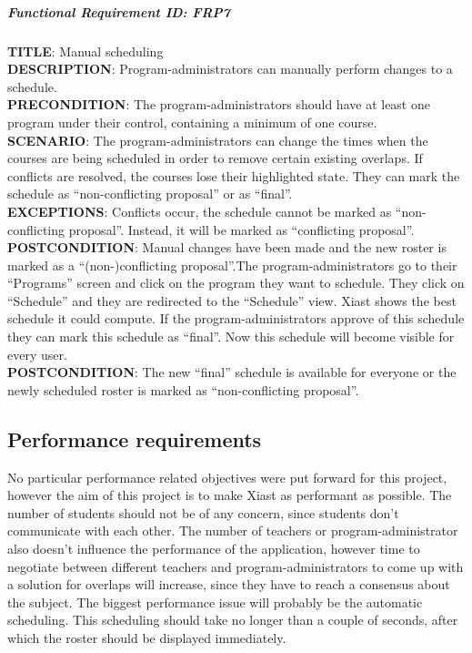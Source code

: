 \documentclass[12pt]{article}
\begin{document}
\subparagraph{Functional Requirement \textbf{ID}:
FRP7}\label{functional-requirement-id-frp7}

\textbf{TITLE}: Manual scheduling\\\textbf{DESCRIPTION}:
Program-administrators can manually perform changes to a
schedule.\\\textbf{PRECONDITION}: The program-administrators should have
at least one program under their control, containing a minimum of one
course.\\\textbf{SCENARIO}: The program-administrators can change the
times when the courses are being scheduled in order to remove certain
existing overlaps. If conflicts are resolved, the courses lose their
highlighted state. They can mark the schedule as ``non-conflicting
proposal'' or as ``final''.\\\textbf{EXCEPTIONS}: Conflicts occur, the
schedule cannot be marked as ``non-conflicting proposal''. Instead, it
will be marked as ``conflicting proposal''.\\\textbf{POSTCONDITION}:
Manual changes have been made and the new roster is marked as a
``(non-)conflicting proposal''.The program-administrators go to their
``Programs'' screen and click on the program they want to schedule. They
click on ``Schedule'' and they are redirected to the ``Schedule'' view.
Xiast shows the best schedule it could compute. If the
program-administrators approve of this schedule they can mark this
schedule as ``final''. Now this schedule will become visible for every
user.\\\textbf{POSTCONDITION}: The new ``final'' schedule is available
for everyone or the newly scheduled roster is marked as
``non-conflicting proposal''.

\subsection{Performance
requirements}\label{performance-requirements}

No particular performance related objectives were put forward for this
project, however the aim of this project is to make Xiast as performant
as possible. The number of students should not be of any concern, since
students don't communicate with each other. The number of teachers or
program-administrator also doesn't influence the performance of the
application, however time to negotiate between different teachers and
program-administrators to come up with a solution for overlaps will
increase, since they have to reach a consensus about the subject. The
biggest performance issue will probably be the automatic scheduling.
This scheduling should take no longer than a couple of seconds, after
which the roster should be displayed immediately.
\end{document}
